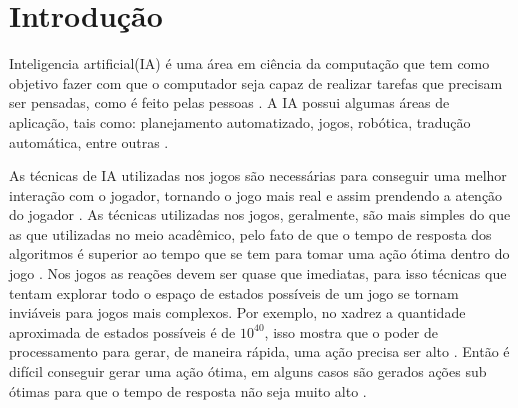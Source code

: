 \chapter{\label{chap:intro}Introdução}

Inteligencia artificial(IA) é uma área em ciência da computação que tem como objetivo fazer com que o computador seja capaz de realizar tarefas que precisam ser pensadas, como é feito pelas pessoas \cite{millington2009artificial}.  
A IA possui algumas áreas de aplicação, tais como: planejamento automatizado, jogos, robótica, tradução automática, entre outras \cite{intelligence2003modern}. 

As técnicas de IA utilizadas nos jogos são necessárias para conseguir uma melhor interação com o jogador, tornando o jogo mais real e assim prendendo a atenção do jogador \cite{millington2009artificial}. 
As técnicas utilizadas nos jogos, geralmente, são mais simples do que as que utilizadas no meio acadêmico, pelo fato de que o tempo de resposta dos algoritmos é superior ao tempo que se tem para tomar uma ação ótima dentro do jogo \cite{intelligence2003modern}. 
Nos jogos as reações devem ser quase que imediatas, para isso técnicas que tentam explorar todo o espaço de estados possíveis de um jogo se tornam inviáveis para jogos mais complexos. 
Por exemplo, no xadrez a quantidade aproximada de estados possíveis é de $10^{40}$, isso mostra que o poder de processamento para gerar, de maneira rápida, uma ação precisa ser alto \cite{millington2009artificial}. Então é difícil conseguir gerar uma ação ótima, em alguns casos são gerados ações sub ótimas para que o tempo de resposta não seja muito alto \cite{intelligence2003modern}. 


